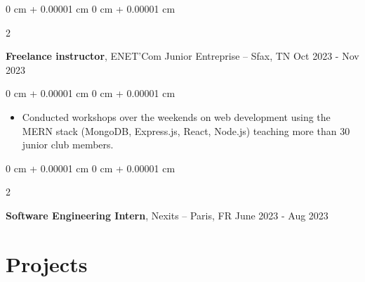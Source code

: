 \documentclass[10pt, letterpaper]{article}
\newenvironment{highlights}{
  \begin{itemize}[
    topsep=0.10 cm,
    parsep=0.10 cm,
    partopsep=0pt,
    itemsep=0pt,
    leftmargin=0 cm + 10pt
    ]
  }{
\end{itemize}
} %
\newenvironment{onecolentry}{
  \begin{adjustwidth}{
      0 cm + 0.00001 cm
    }{
      0 cm + 0.00001 cm
    }
  }{
  \end{adjustwidth}
} %
\newenvironment{twocolentry}[2][]{
  \onecolentry
  \def\secondColumn{#2}
  \setcolumnwidth{\fill, 4.5 cm}
  \begin{paracol}{2}
  }{
    \switchcolumn \raggedleft \secondColumn
  \end{paracol}
  \endonecolentry
} %
\begin{document}
    \begin{twocolentry}{
      Oct 2023 - Nov 2023
    }
  \textbf{Freelance instructor}, ENET’Com Junior Entreprise  -- Sfax, TN\end{twocolentry}

  \vspace{0.10 cm}
  \begin{onecolentry}
    \begin{highlights}

    \item Conducted workshops over the weekends on web development using the MERN stack (MongoDB, Express.js, React, Node.js) teaching more than 30 junior club members.


    \end{highlights}

  \end{onecolentry}





  \begin{twocolentry}{
      June 2023 - Aug 2023
    }
  \textbf{Software Engineering Intern}, Nexits  -- Paris, FR\end{twocolentry}

  \vspace{0.10 cm}

  \section{Projects}




\end{document}
